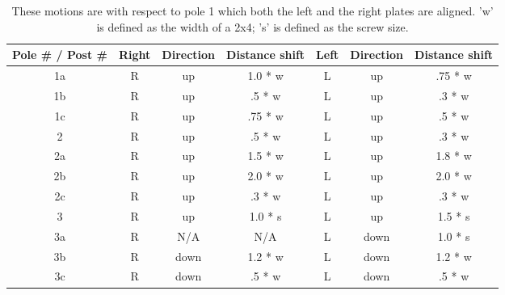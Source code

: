 \documentclass[12pt, letter]{article}
\begin{document}
\begin{table}[!h]
\centering
\begin{tabular}{|c|c|c|c|c|c|c|} \hline
Pole \# / Post \# & Right & Direction & Distance shift &Left & Direction & Distance shift\\ \hline
1a & R & up & 1.0 * w & L & up & .75 * w \\ \hline
1b & R & up &  .5 * w & L & up & .3 * w \\ \hline
1c & R & up & .75 * w & L & up & .5 * w \\ \hline
2 & R & up & .5 * w & L & up & .3 * w \\ \hline
2a & R & up & 1.5 * w & L & up & 1.8 * w \\ \hline
2b & R & up & 2.0 * w & L & up & 2.0 * w \\ \hline
2c & R & up & .3 * w & L & up & .3 * w \\ \hline
3 & R & up & 1.0 * s & L & up & 1.5 * s \\ \hline
3a & R & N/A & N/A & L & down & 1.0 * s \\ \hline 
3b & R & down & 1.2 * w & L & down & 1.2 * w \\ \hline
3c & R & down & .5 * w & L & down & .5 * w \\ \hline
\end{tabular}
\caption{These motions are with respect to pole 1 which both the left and the right plates are aligned. 'w' is defined as the width of a 2x4; 's' is defined as the screw size. \label{Tab:motion_rim}}
\end{table}
\end{document}
